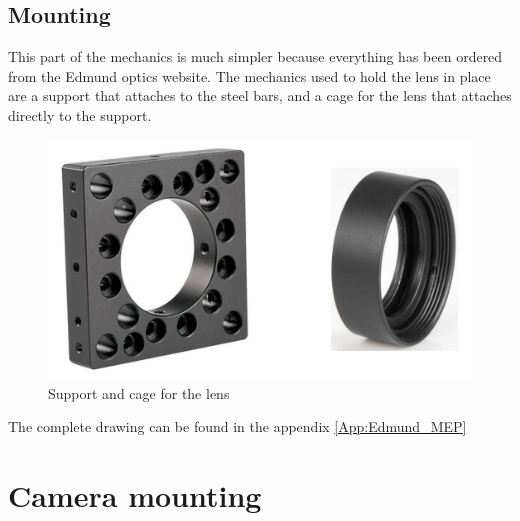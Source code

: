 \subsection{Mounting}
This part of the mechanics is much simpler because everything has been ordered from the Edmund optics website. 
The mechanics used to hold the lens in place are a support that attaches to the steel bars, and a cage for 
the lens that attaches directly to the support.
\begin{figure}[H]
    \centering
    \includegraphics[scale=0.55]{assets/figures/Mechanical Design/Support_Lentille.png}
    \caption{Support and cage for the lens}
    \label{fig:Lentille_Support1}
\end{figure}
\bigbreak
The complete drawing can be found in the appendix \ref{App:Edmund_MEP}
\newpage
\section{Camera mounting}\label{sec:Camera}
